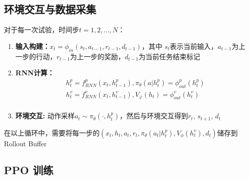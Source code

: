 \documentclass[UTF8]{ctexart}   %
\begin{document}
    \subsection{环境交互与数据采集}
        对于每一次试验，时间步$t = 1, 2, \dots, N$：
        \begin{enumerate}
            \item \textbf{输入构建：}$x_t = \phi_{in}(s_t, a_{t-1}, r_{t-1}, d_{t-1})$，其中%
            $s_t$表示当前输入，$a_{t-1}$为上一步的行动，$r_{t-1}$为上一步的奖励，$d_{t-1}$为当前任务结束标记
            \item \textbf{RNN计算：}
            \begin{align}
                &h_t^p = f_{RNN}^p(x_t, h_{t-1}^p), \pi_\theta(a|h_t^p) = \phi_{out}^p(h_t^p)\\
                &h_t^v = f_{RNN}^v(x_t, h_{t-1}^v), V_\varphi(h_t) = \phi_{out}^v(h_t^v)\\
            \end{align}
            \item \textbf{环境交互:}
                动作采样$a_t \sim \pi_\theta(\cdot , h_t^p)$，然后与环境交互得到$r_t$, $s_{t+1}$, $d_t$
        \end{enumerate}

        在以上循环中，需要将每一步的$(x_t, h_t, a_t, r_t, \pi_\theta(a_t|h_t^p), V_\phi(h_t^v), d_t)$储存到Rollout Buffer

    \subsection{PPO 训练}
        \paragraph{}
\end{document}
